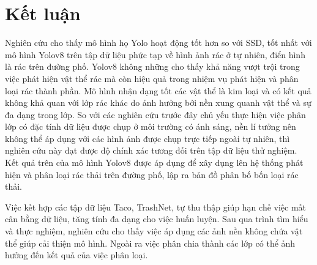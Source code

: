 \documentclass[../the.tex]{subfiles}
\begin{document}
\section{Kết luận}

{\fontsize{13}{12} \selectfont
Nghiên cứu cho thấy mô hình họ Yolo hoạt động tốt hơn so với SSD, tốt nhất với mô hình Yolov8 trên tập dữ liệu phức tạp về hình ảnh rác ở tự nhiên, điển hình là rác trên đường phố.
Yolov8 không những cho thấy khả năng vượt trội trong việc phát hiện vật thể rác mà còn hiệu quả trong nhiệm vụ phát hiện và phân loại rác thành phần.
Mô hình nhận dạng tốt các vật thể là kim loại và có kết quả không khả quan với lớp rác khác do ảnh hưởng bởi nền xung quanh vật thể và sự đa dạng trong lớp.
So với các nghiên cứu trước đây chủ yếu thực hiện việc phân lớp có đặc tính dữ liệu được chụp ở môi trường có ánh sáng, nền lí tưởng nên không thể áp dụng với các hình ảnh được chụp trực tiếp ngoài tự nhiên, thì nghiên cứu này đạt được độ chính xác tương đối trên tập dữ liệu thử nghiệm.
Kết quả trên của mô hình Yolov8 được áp dụng để xây dụng lên hệ thống phát hiện và phân loại rác thải trên đường phố, lập ra bản đồ phân bố bốn loại rác thải.
\selectfont }

\bigskip

{\fontsize{13}{12} \selectfont 
Việc kết hợp các tập dữ liệu Taco, TrashNet, tự thu thập giúp hạn chế việc mất cân bằng dữ liệu, tăng tính đa dạng cho việc huấn luyện.
Sau qua trình tìm hiểu và thực nghiệm, nghiên cứu cho thấy việc áp dụng các ảnh nền không chứa vật thể giúp cải thiện mô hình. Ngoài ra việc phân chia thành các lớp có thể ảnh hưởng đến kết quả của việc phân loại.
}
\end{document}
